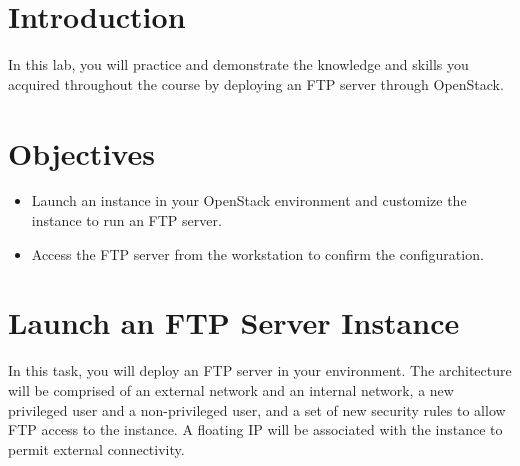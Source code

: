 \documentclass[letterpaper, 12pt]{article}
\begin{document}

\section*{Introduction}
\label{sec:introduction}
In this lab, you will practice and demonstrate the knowledge and skills you acquired throughout the course by deploying
an FTP server through OpenStack.

\section*{Objectives}
\label{sec:objectives}
\begin{itemize}[itemsep=0pt]
    \item Launch an instance in your OpenStack environment and customize the instance to run an FTP server.
    \item Access the FTP server from the workstation to confirm the configuration.
\end{itemize}
\clearpage

\labsettings

\section{Launch an FTP Server Instance}
\label{sec:launch_an_ftp_server_instance}
In this task, you will deploy an FTP server in your environment. The architecture will be comprised of an external
network and an internal network, a new privileged user and a non-privileged user, and a set of new security rules to
allow FTP access to the instance. A floating IP will be associated with the instance to permit external connectivity.
\end{document}
